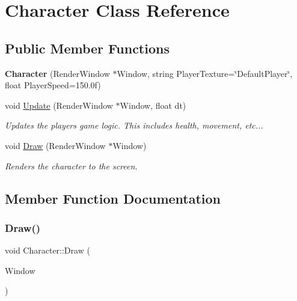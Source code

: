 \hypertarget{class_character}{}\section{Character Class Reference}
\label{class_character}
\subsection*{Public Member Functions}
\begin{DoxyCompactItemize}
\item 
\mbox{\label{class_character_a15ed1692ab60831cce3df30cf1824b93}} 
{\bfseries Character} (Render\+Window $\ast$Window, string Player\+Texture=\char`\"{}Default\+Player\char`\"{}, float Player\+Speed=150.\+0f)
\item 
void \hyperlink{class_character_a4a0a0f23c0a4c15a8c61069441093ef5}{Update} (Render\+Window $\ast$Window, float dt)
\begin{DoxyCompactList}\small\item\em Updates the players game logic. This includes health, movement, etc... \end{DoxyCompactList}\item 
void \hyperlink{class_character_a8eac1c2dd0f9368f5fe04b3dc401f1a6}{Draw} (Render\+Window $\ast$Window)
\begin{DoxyCompactList}\small\item\em Renders the character to the screen. \end{DoxyCompactList}\end{DoxyCompactItemize}


\subsection{Member Function Documentation}
\mbox{\label{class_character_a8eac1c2dd0f9368f5fe04b3dc401f1a6}} 
\subsubsection{\texorpdfstring{Draw()}{Draw()}}
{\footnotesize\ttfamily void Character\+::\+Draw (\begin{DoxyParamCaption}\item[{Render\+Window $\ast$}]{Window }\end{DoxyParamCaption})}



